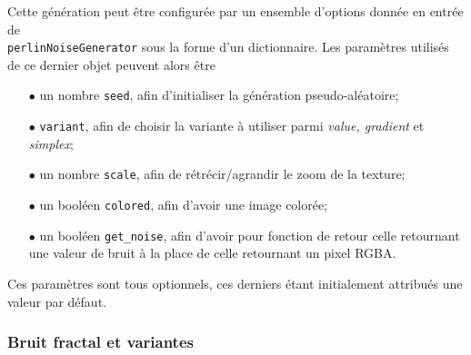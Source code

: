 \documentclass[11pt]{article}
\begin{document}
Cette génération peut être configurée par un ensemble d'options donnée en entrée de \\ \texttt{perlinNoiseGenerator} sous la forme d'un dictionnaire. Les paramètres utilisés de ce dernier objet peuvent alors être
\begin{itemize}
    \item [$\bullet$] un nombre \texttt{seed}, afin d'initialiser la génération pseudo-aléatoire;
    \item [$\bullet$] \texttt{variant}, afin de choisir la variante à utiliser parmi \textit{value, gradient} et \textit{simplex};
    \item [$\bullet$] un nombre \texttt{scale}, afin de rétrécir/agrandir le zoom de la texture;
    \item [$\bullet$] un booléen \texttt{colored}, afin d'avoir une image colorée;
    \item [$\bullet$] un booléen \texttt{get\_noise}, afin d'avoir pour fonction de retour celle retournant une valeur de bruit à la place de celle retournant un pixel RGBA.
\end{itemize}
Ces paramètres sont tous optionnels, ces derniers étant initialement attribués une valeur par défaut.

\subsubsection{Bruit fractal et variantes}
\label{section: fractalNoise}
\end{document}
